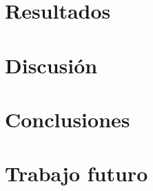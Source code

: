 \chapter{Resultados}
\label{chap:resultados}


\chapter{Discusión}
\label{chap:discusion}


\chapter{Conclusiones}
\label{chap:conclusiones}


\chapter{Trabajo futuro}
\label{chap:futuro}

